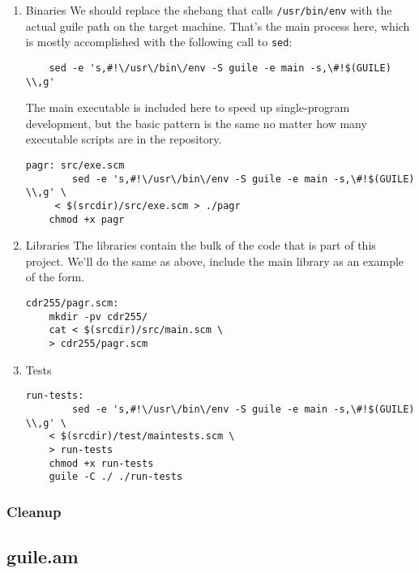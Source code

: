 \documentclass[11pt]{article}
\begin{document}
\begin{enumerate}
\item Binaries
\label{sec:org5ba7296}
We should replace the shebang that calls \texttt{/usr/bin/env} with the actual guile
path on the target machine. That's the main process here, which is mostly
accomplished with the following call to \texttt{sed}:

\begin{verbatim}
	sed -e 's,#!\/usr\/bin\/env -S guile -e main -s,\#!$(GUILE) \\,g'
\end{verbatim}

The main executable is included here to speed up single-program development, but
the basic pattern is the same no matter how many executable scripts are in the
repository.

\begin{verbatim}
pagr: src/exe.scm
		sed -e 's,#!\/usr\/bin\/env -S guile -e main -s,\#!$(GUILE) \\,g' \
	 < $(srcdir)/src/exe.scm > ./pagr
	chmod +x pagr
\end{verbatim}

\item Libraries
\label{sec:orgf2cc3ea}
The libraries contain the bulk of the code that is part of this project. We'll
do the same as above, include the main library as an example of the form.

\begin{verbatim}
cdr255/pagr.scm:
	mkdir -pv cdr255/
	cat < $(srcdir)/src/main.scm \
	> cdr255/pagr.scm
\end{verbatim}

\item Tests
\label{sec:org7f03c60}
\begin{verbatim}
run-tests:
		sed -e 's,#!\/usr\/bin\/env -S guile -e main -s,\#!$(GUILE) \\,g' \
	< $(srcdir)/test/maintests.scm \
	> run-tests
	chmod +x run-tests
	guile -C ./ ./run-tests
\end{verbatim}
\end{enumerate}
\subsubsection{Cleanup}
\label{sec:orgc8e8ba3}

\subsection{guile.am}
\label{sec:orgc8caee5}
\end{document}
